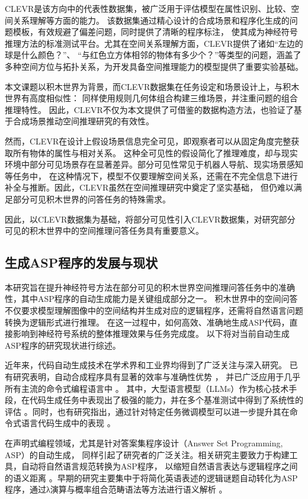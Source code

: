 CLEVR\cite{johnson2017clevr}是该方向中的代表性数据集，被广泛用于评估模型在属性识别、比较、空间关系理解等方面的能力。
该数据集通过精心设计的合成场景和程序化生成的问题模板，有效规避了偏差问题，同时提供了清晰的程序标注，
使其成为神经符号推理方法的标准测试平台。尤其在空间关系理解方面，CLEVR提供了诸如“左边的球是什么颜色？”、
“与红色立方体相邻的物体有多少个？”等类型的问题，涵盖了多种空间方位与拓扑关系，为开发具备空间推理能力的模型提供了重要实验基础。

本文课题以积木世界为背景，而CLEVR数据集在任务设定和场景设计上，与积木世界有高度相似性：
同样使用规则几何体组合构建三维场景，并注重问题的组合推理特性。
因此，CLEVR不仅为本文提供了可借鉴的数据构造方法，也验证了基于合成场景推动空间推理研究的有效性。

然而，CLEVR在设计上假设场景信息完全可见，即观察者可以从固定角度完整获取所有物体的属性与相对关系。
这种全可见性的假设简化了推理难度，却与现实环境中部分可见场景存在显著差异。部分可见性常见于机器人导航、现实场景感知等任务中，
在这种情况下，模型不仅要理解空间关系，还需在不完全信息下进行补全与推断。因此，CLEVR虽然在空间推理研究中奠定了坚实基础，
但仍难以满足部分可见积木世界的问答任务的特殊需求。

因此，以CLEVR数据集为基础，将部分可见性引入CLEVR数据集，对研究部分可见的积木世界中的空间推理问答任务具有重要意义。
\subsection{生成ASP程序的发展与现状}
本研究旨在提升神经符号方法在部分可见的积木世界空间推理问答任务中的准确性，其中ASP程序的自动生成能力是关键组成部分之一。
积木世界中的空间问答不仅要求模型理解图像中的空间结构并生成对应的逻辑程序，还需将自然语言问题转换为逻辑形式进行推理。
在这一过程中，如何高效、准确地生成ASP代码，直接影响到神经符号系统的整体推理效果与任务完成度。
以下将对当前自动生成ASP程序的研究现状进行综述。

近年来，代码自动生成技术在学术界和工业界均得到了广泛关注与深入研究。
已有研究表明，自动合成程序具有显著的效率与准确性优势 \cite{ernst2022ai}\cite{peng2023impact}\cite{dakhel2023github}，
并已广泛应用于几乎所有主流的命令式编程语言中 \cite{chen2021evaluating}。
其中，大型语言模型（LLMs）作为核心技术手段，在代码生成任务中表现出了极强的能力，并在多个基准测试中得到了系统性的评估 \cite{xu2022systematic}\cite{wang2023codet5+}。同时，也有研究指出，通过针对特定任务微调模型可以进一步提升其在命令式语言代码生成中的表现 \cite{ma2024llamoco}。

在声明式编程领域，尤其是针对答案集程序设计（Answer Set Programming, ASP）的自动生成，
同样引起了研究者的广泛关注。相关研究主要致力于构建工具，自动将自然语言规范转换为ASP程序，
以缩短自然语言表达与逻辑程序之间的语义距离 \cite{erdem2009transforming}\cite{fang2017approach}\cite{schwitter2018specifying}\cite{caruso2024cnl2asp}。早期的研究主要集中于将简化英语表述的逻辑谜题自动转化为ASP程序，通过λ演算与概率组合范畴语法等方法进行语义解析 \cite{baral2012solving}。

